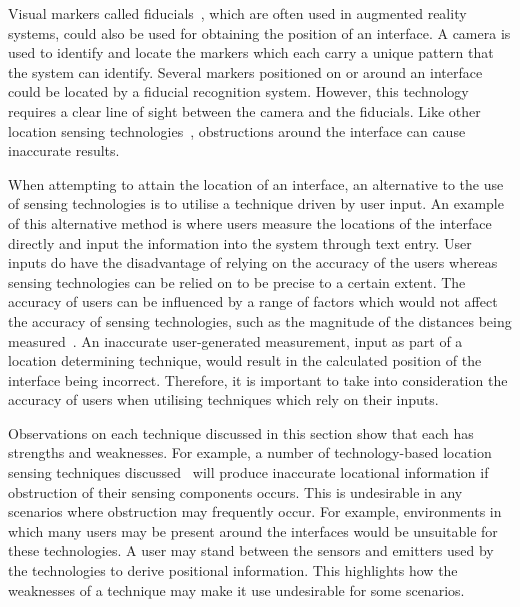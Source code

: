 \documentclass{bmcart}
\begin{document}
Visual markers called fiducials~\cite{Bose1990}, which are often used in augmented reality systems, could also be used for obtaining the position of an interface.
A camera is used to identify and locate the markers which each carry a unique pattern that the system can identify.
Several markers positioned on or around an interface could be located by a fiducial recognition system.
However, this technology requires a clear line of sight between the camera and the fiducials.
Like other location sensing technologies~\cite{Lee2004,Kortuem2005,Ni2004}, obstructions around the interface can cause inaccurate results.

When attempting to attain the location of an interface, an alternative to the use of sensing technologies is to utilise a technique driven by user input.
An example of this alternative method is where users measure the locations of the interface directly and input the information into the system through text entry. 
User inputs do have the disadvantage of relying on the accuracy of the users whereas sensing technologies can be relied on to be precise to a certain extent.
The accuracy of users can be influenced by a range of factors which would not affect the accuracy of sensing technologies, such as the magnitude of the distances being measured~\cite{Al-Imam2006}.
An inaccurate user-generated measurement, input as part of a location determining technique, would result in the calculated position of the interface being incorrect.
Therefore, it is important to take into consideration the accuracy of users when utilising techniques which rely on their inputs.

Observations on each technique discussed in this section show that each has strengths and weaknesses.
For example, a number of technology-based location sensing techniques discussed~\cite{Bose1990,Lee2004,Kortuem2005,Ni2004} will produce inaccurate locational information if obstruction of their sensing components occurs.
This is undesirable in any scenarios where obstruction may frequently occur.
For example, environments in which many users may be present around the interfaces would be unsuitable for these technologies.
A user may stand between the sensors and emitters used by the technologies to derive positional information.
This highlights how the weaknesses of a technique may make it use undesirable for some scenarios.
\end{document}
